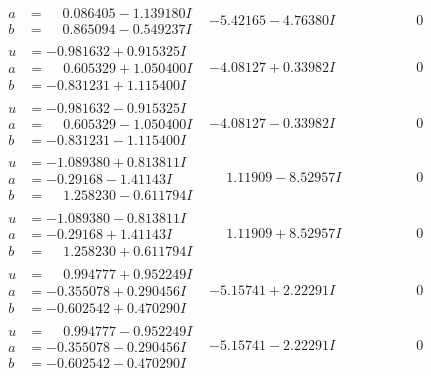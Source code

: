 \documentclass[1p]{elsarticle_modified}
\theoremstyle{definition}
\begin{document}
$$\begin{array}{c|c|c}
\begin{aligned}
a &= \phantom{-}0.086405 - 1.139180 I \\
b &= \phantom{-}0.865094 - 0.549237 I\end{aligned}
 & -5.42165 - 4.76380 I & \phantom{-0.000000 } 0 \\ \hline\begin{aligned}
u &= -0.981632 + 0.915325 I \\
a &= \phantom{-}0.605329 + 1.050400 I \\
b &= -0.831231 + 1.115400 I\end{aligned}
 & -4.08127 + 0.33982 I & \phantom{-0.000000 } 0 \\ \hline\begin{aligned}
u &= -0.981632 - 0.915325 I \\
a &= \phantom{-}0.605329 - 1.050400 I \\
b &= -0.831231 - 1.115400 I\end{aligned}
 & -4.08127 - 0.33982 I & \phantom{-0.000000 } 0 \\ \hline\begin{aligned}
u &= -1.089380 + 0.813811 I \\
a &= -0.29168 - 1.41143 I \\
b &= \phantom{-}1.258230 - 0.611794 I\end{aligned}
 & \phantom{-}1.11909 - 8.52957 I & \phantom{-0.000000 } 0 \\ \hline\begin{aligned}
u &= -1.089380 - 0.813811 I \\
a &= -0.29168 + 1.41143 I \\
b &= \phantom{-}1.258230 + 0.611794 I\end{aligned}
 & \phantom{-}1.11909 + 8.52957 I & \phantom{-0.000000 } 0 \\ \hline\begin{aligned}
u &= \phantom{-}0.994777 + 0.952249 I \\
a &= -0.355078 + 0.290456 I \\
b &= -0.602542 + 0.470290 I\end{aligned}
 & -5.15741 + 2.22291 I & \phantom{-0.000000 } 0 \\ \hline\begin{aligned}
u &= \phantom{-}0.994777 - 0.952249 I \\
a &= -0.355078 - 0.290456 I \\
b &= -0.602542 - 0.470290 I\end{aligned}
 & -5.15741 - 2.22291 I & \phantom{-0.000000 } 0 \\ \hline\begin{aligned}

\end{aligned}
\end{array}$$
\end{document}
